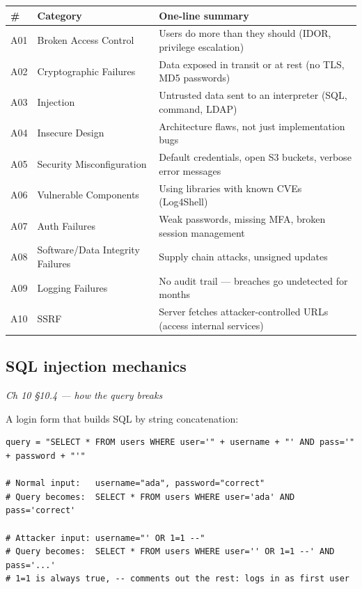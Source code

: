 \documentclass[12pt,openany]{book}
\begin{document}
\begin{center}\small\begin{tabular}{p{4.3cm}p{4.3cm}p{4.3cm}}\toprule
\textbf{\#} & \textbf{Category} & \textbf{One-line summary} \\ \midrule
A01 & Broken Access Control & Users do more than they should (IDOR, privilege escalation) \\
A02 & Cryptographic Failures & Data exposed in transit or at rest (no TLS, MD5 passwords) \\
A03 & Injection & Untrusted data sent to an interpreter (SQL, command, LDAP) \\
A04 & Insecure Design & Architecture flaws, not just implementation bugs \\
A05 & Security Misconfiguration & Default credentials, open S3 buckets, verbose error messages \\
A06 & Vulnerable Components & Using libraries with known CVEs (Log4Shell) \\
A07 & Auth Failures & Weak passwords, missing MFA, broken session management \\
A08 & Software/Data Integrity Failures & Supply chain attacks, unsigned updates \\
A09 & Logging Failures & No audit trail --- breaches go undetected for months \\
A10 & SSRF & Server fetches attacker-controlled URLs (access internal services) \\
\bottomrule\end{tabular}\end{center}

\medskip

\subsection*{SQL injection mechanics}
{\small\itshape\color{gray}Ch 10 §10.4 --- how the query breaks}

A login form that builds SQL by string concatenation:


\begin{lstlisting}
query = "SELECT * FROM users WHERE user='" + username + "' AND pass='" + password + "'"

# Normal input:   username="ada", password="correct"
# Query becomes:  SELECT * FROM users WHERE user='ada' AND pass='correct'

# Attacker input: username="' OR 1=1 --"
# Query becomes:  SELECT * FROM users WHERE user='' OR 1=1 --' AND pass='...'
# 1=1 is always true, -- comments out the rest: logs in as first user\end{lstlisting}
\end{document}
